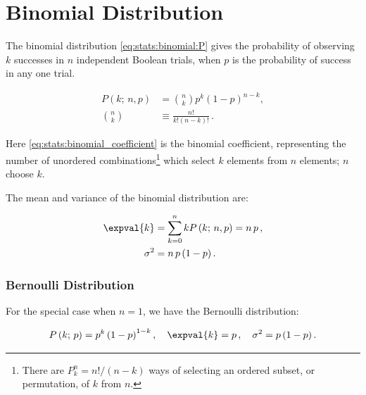 \section{Binomial Distribution}
\label{stats:binomial}

The binomial distribution \cref{eq:stats:binomial:P}
gives the probability of observing $k$ successes in $n$ independent Boolean trials,
when $p$ is the probability of success in any one trial.

\begin{subequations}\label{eq:stats:binomial}
\begin{align}
P\left(k;\,n,p\right) &= {n \choose k}p^{k} \left(1-p\right)^{n-k}, \label{eq:stats:binomial:P} \\
{n \choose k} &\equiv \frac{n!}{k!\left(n-k\right)!}\,. \label{eq:stats:binomial_coefficient}
\end{align}
\end{subequations}

\noindent Here \cref{eq:stats:binomial_coefficient} is the binomial coefficient,
representing the number of unordered combinations\footnote{There are
$P_{k}^{n} = n! / \left(n-k\right)$ ways of selecting an ordered subset,
or permutation, of $k$ from $n$.} which select $k$ elements from $n$ elements; $n$ choose $k$.

The mean and variance of the binomial distribution are:

\begin{subequations}\label{eq:stats:binomial:mean_variance}
\begin{align}
\expval{k} &= \sum_{k=0}^{n} kP\left(k;\,n,p\right) = n\,p\,, \label{eq:stats:binomial:mean} \\
\sigma^{2} &= n\,p\left(1-p\right). \label{eq:stats:binomial:variance}
\end{align}
\end{subequations}

\subsubsection{Bernoulli Distribution}
\label{stats:binomial:bernoulli}

For the special case when $n=1$, we have the Bernoulli distribution:

\begin{equation}\label{eq:stats:bernoulli}
P\left(k;\,p\right) = p^{k} \left(1-p\right)^{1-k}, \quad \expval{k} = p\,, \quad  \sigma^{2} = p\left(1-p\right).
\end{equation}

